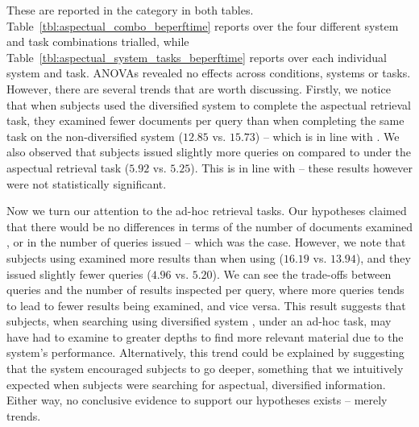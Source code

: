 These are reported in the  category in both tables. Table~\ref{tbl:aspectual_combo_beperftime} reports over the four different system and task combinations trialled, while Table~\ref{tbl:aspectual_system_tasks_beperftime} reports over each individual system and task. ANOVAs revealed no effects across conditions, systems or tasks. However, there are several trends that are worth discussing. Firstly, we notice that when subjects used the diversified system  to complete the aspectual retrieval task, they examined fewer documents per query than when completing the same task on the non-diversified system  ($12.85$ vs. $15.73$) -- which is in line with . We also observed that subjects issued slightly more queries on  compared to  under the aspectual retrieval task ($5.92$ vs. $5.25$). This is in line with  -- these results however were not statistically significant.

Now we turn our attention to the ad-hoc retrieval tasks. Our hypotheses claimed that there would be no differences in terms of the number of documents examined , or in the number of queries issued  -- which was the case. However, we note that subjects using  examined more results than when using  ($16.19$ vs. $13.94$), and they issued slightly fewer queries ($4.96$ vs. $5.20$). We can see the trade-offs between queries and the number of results inspected per query, where more queries tends to lead to fewer results being examined, and vice versa. This result suggests that subjects, when searching using diversified system , under an ad-hoc task, may have had to examine to greater depths to find more relevant material due to the system's performance. Alternatively, this trend could be explained by suggesting that the system encouraged subjects to go deeper, something that we intuitively expected when subjects were searching for aspectual, diversified information. Either way, no conclusive evidence to support our hypotheses exists -- merely trends.

